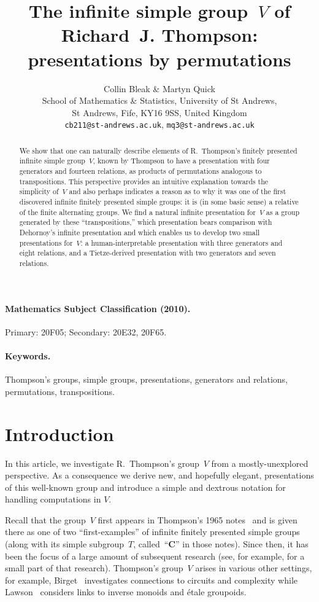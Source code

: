 \documentclass[a4paper,11pt]{article}
\title{The infinite simple group~$V$ of Richard~J. Thompson:
  presentations by permutations}
\author{Collin Bleak \& Martyn Quick\\[10pt]
  School of Mathematics \& Statistics, University of St Andrews,\\
  St Andrews, Fife, KY16 9SS, United Kingdom\\
  \texttt{cb211@st-andrews.ac.uk}, \texttt{mq3@st-andrews.ac.uk}}
\numberwithin{equation}{section}
\begin{document}
\maketitle

\begin{abstract}
  We show that one can naturally describe elements of R.~Thompson's
  finitely presented infinite simple group~$V$, known by Thompson to
  have a presentation with four generators and fourteen relations, as
  products of permutations analogous to transpositions.  This
  perspective provides an intuitive explanation towards the simplicity
  of~$V$ and also perhaps indicates a reason as to why it was one of
  the first discovered infinite finitely presented simple groups: it
  is (in some basic sense) a relative of the finite alternating
  groups.  We find a natural infinite presentation for~$V$ as a group
  generated by these ``transpositions,'' which presentation bears
  comparison with Dehornoy's infinite presentation and which enables
  us to develop two small presentations for~$V$: a human-interpretable
  presentation with three generators and eight relations, and a
  Tietze-derived presentation with two generators and seven
  relations.

\end{abstract}

\paragraph{Mathematics Subject Classification (2010).} Primary: 20F05;
Secondary: 20E32, 20F65.

\paragraph{Keywords.} Thompson's groups, simple groups, presentations,
generators and relations, permutations, transpositions.

\section{Introduction}

In this article, we investigate R.~Thompson's group~$V$ from a
mostly-unexplored perspective.  As a consequence we derive new, and
hopefully elegant, presentations of this well-known group and
introduce a simple and dextrous notation for handling computations in
$V$.

Recall that the group~$V$ first appears in Thompson's 1965
notes~\cite{ThompsonNotes} and is given there as one of two
``first-examples'' of infinite finitely presented simple groups (along
with its simple subgroup~$T$, called~``\textbf{C}'' in those notes).
Since then, it has been the focus of a large amount of subsequent
research (see, for example, \cite{BMM, BleakSal, Brin-higher,
  Dehornoy, Higman, Lawson-completions, Thumann} for a small part of
that research).  Thompson's group~$V$ arises in various other
settings, for example, Birget~\cite{Birget-circuits, Birget2}
investigates connections to circuits and complexity while
Lawson~\cite{Lawson2} considers links to inverse monoids and \'{e}tale
groupoids.
\end{document}
